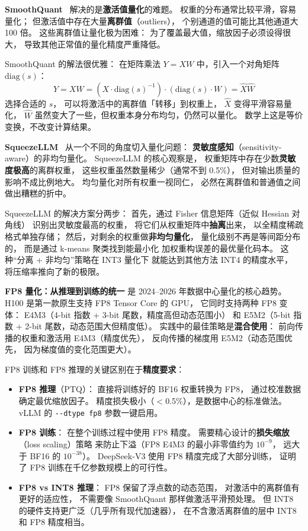 \textbf{SmoothQuant}~\cite{xiao2023smoothquant} 解决的是\textbf{激活值量化}的难题。
权重的分布通常比较平滑，容易量化；
但激活值中存在大量\textbf{离群值}（outliers），
个别通道的值可能比其他通道大 100 倍。
这些离群值让量化极为困难：
为了覆盖最大值，缩放因子必须设得很大，
导致其他正常值的量化精度严重降低。

SmoothQuant 的解法很优雅：
在矩阵乘法 $Y = XW$ 中，引入一个对角矩阵 $\mathrm{diag}(s)$：
\begin{equation}
  Y = XW = (X \cdot \mathrm{diag}(s)^{-1}) \cdot (\mathrm{diag}(s) \cdot W)
  = \hat{X} \hat{W}
\end{equation}
选择合适的 $s$，
可以将激活中的离群值「转移」到权重上，
$\hat{X}$ 变得平滑容易量化，
$\hat{W}$ 虽然变大了一些，但权重本身分布均匀，仍然可以量化。
数学上这是等价变换，不改变计算结果。

\textbf{SqueezeLLM}~\cite{kim2024squeezellm}
从一个不同的角度切入量化问题：
\textbf{灵敏度感知}（sensitivity-aware）的非均匀量化。
SqueezeLLM 的核心观察是，
权重矩阵中存在少数\textbf{灵敏度极高}的离群权重，
这些权重虽然数量稀少（通常不到 0.5\%），
但对输出质量的影响不成比例地大。
均匀量化对所有权重一视同仁，
必然在离群值和普通值之间做出糟糕的折中。

SqueezeLLM 的解决方案分两步：
首先，通过 Fisher 信息矩阵（近似 Hessian 对角线）
识别出灵敏度最高的权重，
将它们从权重矩阵中\textbf{抽离}出来，
以全精度稀疏格式单独存储；
然后，对剩余的权重做\textbf{非均匀量化}，
量化级别不再是等间距分布的，
而是通过 k-means 聚类找到能最小化
加权重构误差的最优量化码本。
这种“分离 + 非均匀”策略在 INT3 量化下
就能达到其他方法 INT4 的精度水平，
将压缩率推向了新的极限。

\textbf{FP8 量化：从推理到训练的统一}
是 2024--2026 年数据中心量化的核心趋势。
H100 是第一款原生支持 FP8 Tensor Core 的 GPU，
它同时支持两种 FP8 变体：
E4M3（4-bit 指数 + 3-bit 尾数，精度高但动态范围小）
和 E5M2（5-bit 指数 + 2-bit 尾数，动态范围大但精度低）。
实践中的最佳策略是\textbf{混合使用}：
前向传播的权重和激活用 E4M3（精度优先），
反向传播的梯度用 E5M2（动态范围优先，
因为梯度值的变化范围更大）。

FP8 训练和 FP8 推理的关键区别在于\textbf{精度要求}：
\begin{itemize}[noitemsep]
  \item \textbf{FP8 推理}（PTQ）：
        直接将训练好的 BF16 权重转换为 FP8，
        通过校准数据确定最优缩放因子。
        精度损失极小（$<$0.5\%），是数据中心的标准做法。
        vLLM 的 \texttt{-{}-dtype fp8} 参数一键启用。
  \item \textbf{FP8 训练}：
        在整个训练过程中使用 FP8 精度。
        需要精心设计的\textbf{损失缩放}（loss scaling）策略
        来防止下溢（FP8 E4M3 的最小非零值约为 $10^{-9}$，
        远大于 BF16 的 $10^{-38}$）。
        DeepSeek-V3 使用 FP8 精度完成了大部分训练，
        证明了 FP8 训练在千亿参数规模上的可行性。
  \item \textbf{FP8 vs INT8 推理}：
        FP8 保留了浮点数的动态范围，
        对激活中的离群值有更好的适应性，
        不需要像 SmoothQuant 那样做激活平滑预处理。
        但 INT8 的硬件支持更广泛（几乎所有现代加速器），
        在不含激活离群值的层中 INT8 和 FP8 精度相当。
\end{itemize}

